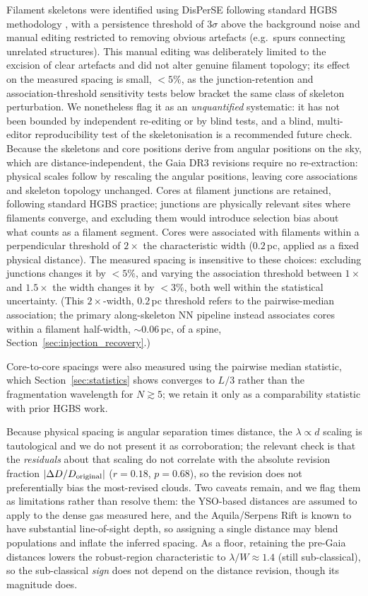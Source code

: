 \documentclass[usenatbib,twoside,twocolumn]{mnras}
\begin{document}
Filament skeletons were identified using DisPerSE \citep{Sousbie2011} following standard HGBS methodology \citep{Arzoumanian2011}, with a persistence threshold of $3\sigma$ above the background noise and manual editing restricted to removing obvious artefacts (e.g.\ spurs connecting unrelated structures). This manual editing was deliberately limited to the excision of clear artefacts and did not alter genuine filament topology; its effect on the measured spacing is small, $<5\%$, as the junction-retention and association-threshold sensitivity tests below bracket the same class of skeleton perturbation. We nonetheless flag it as an \emph{unquantified} systematic: it has not been bounded by independent re-editing or by blind tests, and a blind, multi-editor reproducibility test of the skeletonisation is a recommended future check. Because the skeletons and core positions derive from angular positions on the sky, which are distance-independent, the Gaia DR3 revisions require no re-extraction: physical scales follow by rescaling the angular positions, leaving core associations and skeleton topology unchanged. Cores at filament junctions are retained, following standard HGBS practice; junctions are physically relevant sites where filaments converge, and excluding them would introduce selection bias about what counts as a filament segment. Cores were associated with filaments within a perpendicular threshold of $2\times$ the characteristic width ($0.2$\,pc, applied as a fixed physical distance). The measured spacing is insensitive to these choices: excluding junctions changes it by $<5\%$, and varying the association threshold between $1\times$ and $1.5\times$ the width changes it by $<3\%$, both well within the statistical uncertainty. (This $2\times$-width, $0.2$\,pc threshold refers to the pairwise-median association; the primary along-skeleton NN pipeline instead associates cores within a filament half-width, $\sim0.06$\,pc, of a spine, Section~\ref{sec:injection_recovery}.)

Core-to-core spacings were also measured using the pairwise median statistic, which Section~\ref{sec:statistics} shows converges to $L/3$ rather than the fragmentation wavelength for $N\gtrsim5$; we retain it only as a comparability statistic with prior HGBS work.

Because physical spacing is angular separation times distance, the $\lambda\propto d$ scaling is tautological and we do not present it as corroboration; the relevant check is that the \emph{residuals} about that scaling do not correlate with the absolute revision fraction $|\Delta D/D_{\rm original}|$ ($r=0.18$, $p=0.68$), so the revision does not preferentially bias the most-revised clouds. Two caveats remain, and we flag them as limitations rather than resolve them: the YSO-based distances \citep{Zhang2023} are assumed to apply to the dense gas measured here, and the Aquila/Serpens Rift is known to have substantial line-of-sight depth, so assigning a single distance may blend populations and inflate the inferred spacing. As a floor, retaining the pre-Gaia distances lowers the robust-region characteristic to $\lambda/W\approx1.4$ (still sub-classical), so the sub-classical \emph{sign} does not depend on the distance revision, though its magnitude does.
\end{document}
